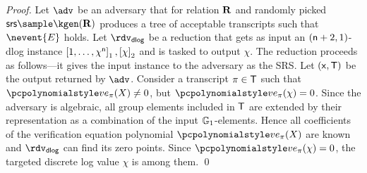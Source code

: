 \documentclass[runningheads,11pt]{llncs}
\begin{document}
\begin{proof}
   Let $\adv$ be an adversary that for relation
  $\mathbf{R}$ and randomly picked $\srs \sample \kgen(\REL)$ produces a tree of
  acceptable transcripts such that $\nevent{E}$ holds. Let $\rdvdlog$ be a
  reduction that gets as input an $(\mathsf{n} + 2, 1)$-dlog instance
  $\left[1, \ldots, \chi^{\mathsf{n}}\right]_{1}, \left[\chi\right]_{2}$ and is tasked to output
  $\chi$. The reduction proceeds as follows---it gives the input instance to the
  adversary as the SRS. Let $(\mathsf{x}, \mathsf{T})$ be the output returned by $\adv$.
  Consider a transcript $\pi \in \mathsf{T}$ such that
  $\vereq_\zkproof(X) \neq 0$, but $\vereq_\zkproof(\chi) = 0$. Since the
  adversary is algebraic, all group elements included in $\mathsf{T}$ are extended by
  their representation as a combination of the input $\mathbb{G}_1$-elements. Hence all coefficients of
  the verification equation polynomial $\vereq_\zkproof(X)$ are known and $\rdvdlog$ can
  find its zero points. Since $\vereq_\zkproof(\chi) = 0$, the targeted discrete log
  value $\chi$ is among them. \qed
\end{proof}
\end{document}
